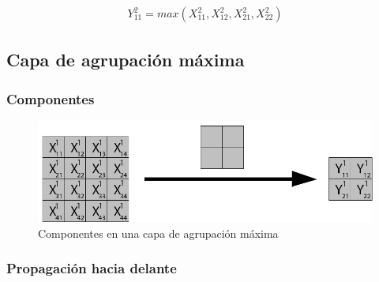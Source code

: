 \begin{gather}
	Y^2_{11} = max(X^2_{11}, X^2_{12}, X^2_{21}, X^2_{22})
\end{gather}

\subsection{Capa de agrupación máxima}

\subsubsection{Componentes}

\begin{figure}[H]
	\centering
	\includegraphics[scale=0.35]{imagenes/pool_nombres.jpg}  
	\caption{Componentes en una capa de agrupación máxima}
\end{figure}

\subsubsection{Propagación hacia delante}

